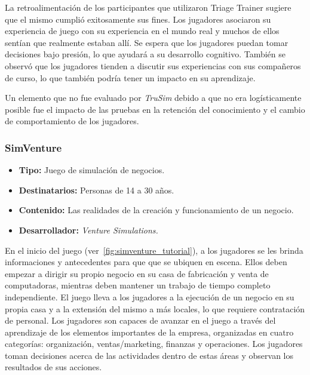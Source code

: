 La retroalimentación de los participantes que utilizaron Triage Trainer sugiere
que el mismo cumplió exitosamente sus fines. Los jugadores asociaron su
experiencia de juego con su experiencia en el mundo real y muchos de ellos
sentían que realmente estaban allí. Se espera que los jugadores puedan tomar
decisiones bajo presión, lo que ayudará a su desarrollo cognitivo. También se
observó que los jugadores tienden a discutir sus experiencias con sus compañeros
de curso, lo que también podría tener un impacto en su aprendizaje.

Un elemento que no fue evaluado por \emph{TruSim} debido a que no era
logísticamente posible fue el impacto de las pruebas en la retención del
conocimiento y el cambio de comportamiento de los
jugadores\cite{education:games}. 


\subsubsection{SimVenture}

\begin{itemize}
\item \textbf{Tipo:} Juego de simulación de negocios.
\item \textbf{Destinatarios:} Personas de 14 a 30 años.
\item \textbf{Contenido:} Las realidades de la creación y funcionamiento de un
    negocio.
\item \textbf{Desarrollador:} \emph{Venture Simulations.}
\end{itemize}

En el inicio del juego (ver~\ref{fig:simventure_tutorial}), a los jugadores se
les brinda informaciones y antecedentes para que que se ubiquen en escena. Ellos
deben empezar a dirigir su propio negocio en su casa de fabricación y venta de
computadoras, mientras deben mantener un trabajo de tiempo completo
independiente. El juego lleva a los jugadores a la ejecución de un negocio en su
propia casa y a la extensión del mismo a más locales, lo que requiere
contratación de personal. Los jugadores son capaces de avanzar en el juego a
través del aprendizaje de los elementos importantes de la empresa, organizadas
en cuatro categorías: organización, ventas/marketing, finanzas y operaciones.
Los jugadores toman decisiones acerca de las actividades dentro de estas áreas y
observan los resultados de sus acciones. 

